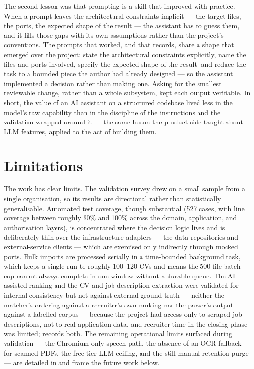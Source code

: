 The second lesson was that prompting is a skill that improved with
practice. When a prompt leaves the architectural constraints implicit ---
the target files, the ports, the expected shape of the result --- the
assistant has to guess them, and it fills those gaps with its own
assumptions rather than the project's conventions.
The prompts that worked, and that 
records, share a shape that emerged over the project: state the architectural
constraints explicitly, name the files and ports involved, specify the
expected shape of the result, and reduce the task to a bounded piece the
author had already designed --- so the assistant implemented a decision rather
than making one. Asking for the smallest reviewable change, rather than a
whole subsystem, kept each output verifiable. In short, the value of an AI
assistant on a structured codebase lived less in the model's raw capability
than in the discipline of the instructions and the validation wrapped around
it --- the same lesson the product side taught about LLM features, applied to
the act of building them.


\section{Limitations}
\label{sec:concl-limitations}

The work has clear limits. The validation survey drew on a small sample from
a single organisation, so its results are directional rather than
statistically generalisable. Automated test coverage, though substantial
(527 cases, with line coverage between roughly 80\% and 100\% across the
domain, application, and authorisation layers), is concentrated where the
decision logic lives and is deliberately thin over the infrastructure
adapters --- the data repositories and external-service clients --- which are
exercised only indirectly through mocked ports. Bulk imports
are processed serially in a time-bounded background task, which keeps a single
run to roughly 100--120 CVs and means the 500-file batch cap cannot always
complete in one window without a durable queue. The AI-assisted ranking and
the CV and job-description extraction were validated for internal consistency
but not against external ground truth --- neither the matcher's ordering
against a recruiter's own ranking nor the parser's output against a labelled
corpus --- because the project had access only to scraped job descriptions,
not to real application data, and recruiter time in the closing phase was
limited;  records both. The remaining operational
limits surfaced during validation --- the Chromium-only speech path, the
absence of an OCR fallback for scanned PDFs, the free-tier LLM ceiling, and
the still-manual retention purge --- are detailed in
 and frame the future work below.


